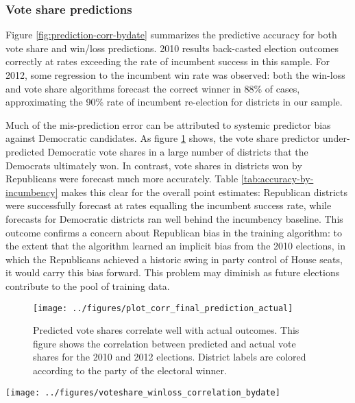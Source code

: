 \documentclass{article}
\begin{document}
\subsubsection{Vote share predictions}
\label{sec:predictions}

Figure \ref{fig:prediction-corr-bydate} summarizes the predictive
accuracy for both vote share and win/loss predictions. 2010 results
back-casted election outcomes correctly at rates exceeding the
rate of incumbent success in this sample. For 2012, some regression to
the incumbent win rate was observed: both the win-loss and vote share
algorithms forecast the correct winner in 88\% of cases, approximating
the 90\% rate of incumbent re-election for districts in our sample.

Much of the mis-prediction error can be attributed to systemic
predictor bias against Democratic candidates. As figure
\ref{fig:corr-voteshare} shows, the vote share predictor
under-predicted Democratic vote shares in a large number of districts
that the Democrats ultimately won. In contrast, vote shares in districts
won by Republicans were forecast much more accurately. Table
\ref{tab:accuracy-by-incumbency} makes this clear for the overall
point estimates: Republican districts were successfully forecast at
rates equalling the incumbent success rate, while forecasts for
Democratic districts ran well behind the incumbency baseline. This outcome
confirms a concern about Republican bias in the training algorithm: to
the extent that the algorithm learned an implicit bias from the 2010
elections, in which the Republicans achieved a historic swing in party
control of House seats, it would carry this bias forward. This problem
may diminish as future elections contribute to the pool of training data.



\begin{figure}[ht]
  \centering
  \texttt{[image: ../figures/plot\_corr\_final\_prediction\_actual]}
  \caption{Predicted vote shares correlate well with actual
    outcomes. This figure shows the correlation between predicted and
    actual vote shares for the 2010 and 2012 elections. District
    labels are colored according to the party of the electoral winner.}
  \label{fig:corr-voteshare}
\end{figure}

\begin{figure*}[ht]
  \centering
  \texttt{[image: ../figures/voteshare\_winloss\_correlation\_bydate]}
  \caption{Predictive algorithms provide accuracy leading
    forecasts. This figure shows the predictive accuracy of both the
    vote share and win/loss algorithms for each day in the general election campaign. Predictions are back-cast for the 2010 election, using the trained algorithm; and forecast for the 2012 election. Vote shares were converted to win/loss predictions at the 50\% cut point. Horizontal lines indicate the incumbent win rate for the districts in the total population of forecasted districts.}
  \label{fig:prediction-corr-bydate}
\end{figure*}
\end{document}
